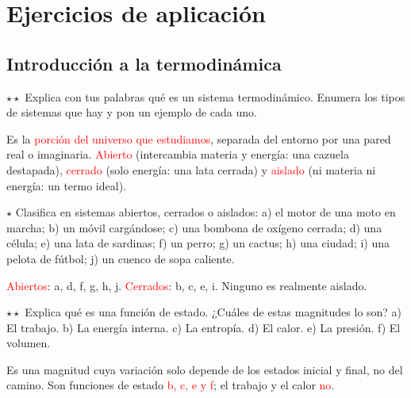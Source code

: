\section{Ejercicios de aplicación}\label{sec:ud13-aplicacion}

\subsection{Introducción a la termodinámica}

\begin{exercise}
    \(\star\star\) Explica con tus palabras qué es un sistema termodinámico. Enumera los tipos de sistemas que hay y pon un ejemplo
    de cada uno.
    \begin{solu}
        Es la \textcolor{red}{porción del universo que estudiamos}, separada del entorno por una pared real o imaginaria.
        \textcolor{red}{Abierto} (intercambia materia y energía: una cazuela destapada), \textcolor{red}{cerrado} (solo energía: una
        lata cerrada) y \textcolor{red}{aislado} (ni materia ni energía: un termo ideal).
    \end{solu}
\end{exercise}

\begin{exercise}
    \(\star\) Clasifica en sistemas abiertos, cerrados o aislados: a) el motor de una moto en marcha; b) un móvil cargándose; c) una
    bombona de oxígeno cerrada; d) una célula; e) una lata de sardinas; f) un perro; g) un cactus; h) una ciudad; i) una pelota de
    fútbol; j) un cuenco de sopa caliente.
    \begin{solu}
        \textcolor{red}{Abiertos}: a, d, f, g, h, j. \textcolor{red}{Cerrados}: b, c, e, i. Ninguno es realmente aislado.
    \end{solu}
\end{exercise}

\begin{exercise}
    \(\star\star\) Explica qué es una función de estado. ¿Cuáles de estas magnitudes lo son? a) El trabajo. b) La energía interna. c)
    La entropía. d) El calor. e) La presión. f) El volumen.
    \begin{solu}
        Es una magnitud cuya variación solo depende de los estados inicial y final, no del camino. Son funciones de estado
        \textcolor{red}{b, c, e y f}; el trabajo y el calor \textcolor{red}{no}.
    \end{solu}
\end{exercise}

